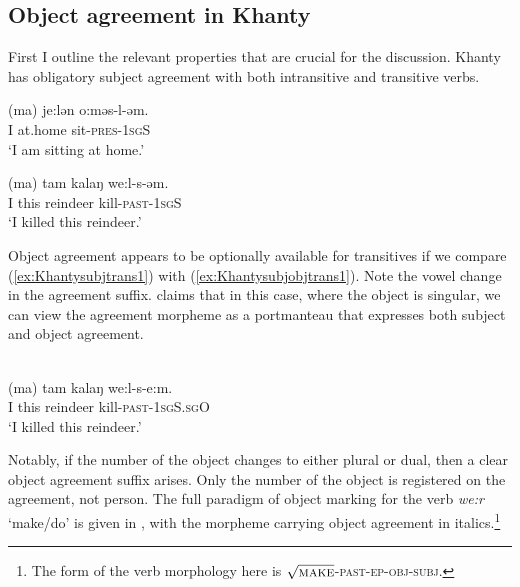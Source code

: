 \documentclass[output=paper
,modfonts
,nonflat]{langsci/langscibook}
\begin{document}
\subsection{Object agreement in Khanty}\label{khantyprop}

First I outline the relevant properties that are crucial for the discussion.
Khanty has obligatory subject agreement with both intransitive and transitive verbs.

\begin{exe}
\ex \citet[][142]{dn2011}
\begin{xlist}
\ex
{\gll (ma) je:lən o:məs-l-əm.\\
I at.home sit-\textsc{pres}-\textsc{1sgS}\\
\glt `I am sitting at home.'} \label{ex:ostsubjintrans1}

\ex
{\gll (ma) tam kalaŋ we:l-s-əm.\\
I this reindeer kill-\textsc{past-1sgS}\\
\glt `I killed this reindeer.'} \label{ex:Khantysubjtrans1}
\end{xlist}
\end{exe}

\noindent Object agreement appears to be optionally available for transitives if we compare (\ref{ex:Khantysubjtrans1}) with (\ref{ex:Khantysubjobjtrans1}). Note the vowel change in the agreement suffix. \citet{nikolaeva1999} claims that in this case, where the object is singular, we can view the agreement morpheme as a portmanteau that expresses both subject and object agreement.

\begin{exe}
  \ex \citet[][142]{dn2011}\\
{\gll (ma) tam kalaŋ we:l-s-e:m.\\
I this reindeer kill-\textsc{past-1sgS.sgO}\\
\glt `I killed this reindeer.'} \label{ex:Khantysubjobjtrans1}
\end{exe}

\noindent Notably, if the number of the object changes to either plural or dual, then a clear object agreement suffix arises.
Only the number of the object is registered on the agreement, not person.
The full paradigm of object marking for the verb \textit{we:r} `make/do' is given in , with the morpheme carrying object agreement in italics.\footnote{The form of the verb morphology here is $\sqrt{\textsc{make}}$-\textsc{past}-\textsc{ep}-\textsc{obj}-\textsc{subj}.}
\end{document}
